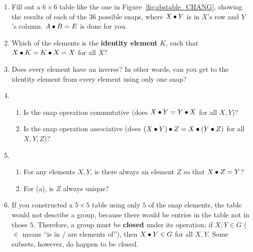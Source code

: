 \documentclass[../gatm.tex]{subfiles}
\begin{document}
\begin{enumerate}
	\item Fill out a $6\times 6$ table like the one in Figure~\ref{fig:sbstable_CHANG}, showing the results of each of the $36$ possible snaps, where $X\bullet Y$ is in $X$'s row and $Y$'s column. %
	      $A\bullet B=E$ is done for you.
	\item Which of the elements is the \textbf{identity element} $K$, such that $X\bullet K = K\bullet X = X$ for all $X$?
	\item Does every element have an inverse? In other words, can you get to the identity element from every element using only one snap?
	\item \begin{enumerate}
		      \item Is the snap operation commutative (does $X \bullet Y = Y \bullet X$ for all $X,Y$)?
		      \item Is the snap operation associative (does $(X \bullet Y) \bullet Z = X \bullet (Y\bullet Z)$ for all $X,Y,Z$)?
	      \end{enumerate}
	\item \begin{enumerate}
		      \item For any elements $X, Y$, is there always an element $Z$ so that $X\bullet Z=Y$?
		      \item For (a), is $Z$ always unique?
	      \end{enumerate}
	\item If you constructed a $5\times 5$ table using only $5$ of the snap elements, the table would not describe a group, because there would be entries in the table not in those $5$.
	      Therefore, a group must be \textbf{closed} under its operation; if $X,Y\in G$ ($\in$ means ``is in / are elements of''), then $X\bullet Y\in G$ for all $X,Y$.
	      Some subsets, however, do happen to be closed.


\end{enumerate}
\end{document}
